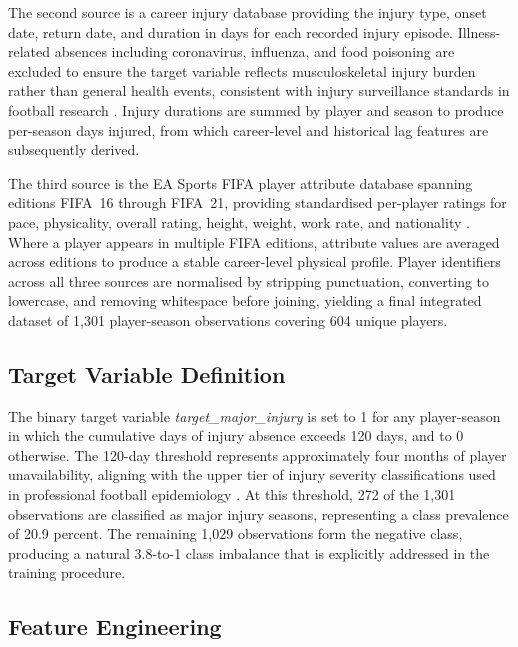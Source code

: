 \documentclass[conference]{IEEEtran}
\begin{document}
The second source is a career injury database providing the injury type, onset date, return date, and duration in days for each recorded injury episode. Illness-related absences including coronavirus, influenza, and food poisoning are excluded to ensure the target variable reflects musculoskeletal injury burden rather than general health events, consistent with injury surveillance standards in football research \cite{fuller2006consensus}. Injury durations are summed by player and season to produce per-season days injured, from which career-level and historical lag features are subsequently derived.

The third source is the EA Sports FIFA player attribute database spanning editions FIFA~16 through FIFA~21, providing standardised per-player ratings for pace, physicality, overall rating, height, weight, work rate, and nationality \cite{pappalardo2019playerank}. Where a player appears in multiple FIFA editions, attribute values are averaged across editions to produce a stable career-level physical profile. Player identifiers across all three sources are normalised by stripping punctuation, converting to lowercase, and removing whitespace before joining, yielding a final integrated dataset of 1,301 player-season observations covering 604 unique players.

\subsection{Target Variable Definition}

The binary target variable \textit{target\_major\_injury} is set to 1 for any player-season in which the cumulative days of injury absence exceeds 120 days, and to 0 otherwise. The 120-day threshold represents approximately four months of player unavailability, aligning with the upper tier of injury severity classifications used in professional football epidemiology \cite{fuller2006consensus}. At this threshold, 272 of the 1,301 observations are classified as major injury seasons, representing a class prevalence of 20.9 percent. The remaining 1,029 observations form the negative class, producing a natural 3.8-to-1 class imbalance that is explicitly addressed in the training procedure.

\subsection{Feature Engineering}
\end{document}
